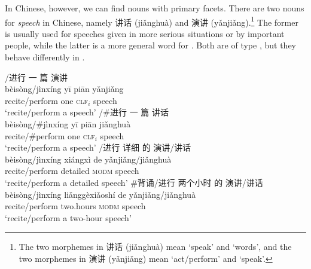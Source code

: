 \documentclass[output=paper,colorlinks,citecolor=brown,chinesefont]{langscibook}
\begin{document}

In Chinese, however, we can find \dott{} nouns with primary facets.
There are two nouns for \emph{speech} in Chinese, namely {\cn 讲话} (ji\v{a}nghu\`{a}) and {\cn 演讲} (y\v{a}nji\v{a}ng).\footnote{The two morphemes in {\cn 讲话} (ji\v{a}nghu\`{a}) mean `speak' and `words', and the two morphemes in {\cn 演讲} (y\v{a}nji\v{a}ng) mean `act/perform' and `speak'. 
}
The former is usually used for speeches given in more serious situations or by important people, while the latter is a more general word for . Both are of type \dott{}, but they behave differently in .



\ea \label{ex:classifierspeech:Chen}
\ea \label{ex:pianyanjiang:Chen}
/{\cn 进行} {\cn 一} {\cn 篇} {\cn 演讲}\\
b\`{e}is\`{o}ng/j\`{i}nx\'{i}ng y\={i} pi\={a}n y\v{a}nji\v{a}ng\\
recite/perform one \textsc{clf}$_i$ speech\\
\glt `recite/perform a speech'
\ex \label{ex:pianjianghua:Chen}
/\#{\cn 进行} {\cn 一} {\cn 篇} {\cn 讲话}\\
b\`{e}is\`{o}ng/\#j\`{i}nx\'{i}ng y\={i} pi\={a}n ji\v{a}nghu\`{a}\\
recite/\#perform one \textsc{clf}$_i$ speech\\
\glt `recite/perform a speech'
%
\ex
{}/{\cn 进行} {\cn 详细} {\cn 的} {\cn 演讲}/{\cn 讲话} \label{ex:detailedspeech:Chen}\\
b\`{e}is\`{o}ng/j\`{i}nx\'{i}ng xi\'{a}ngx\`{i} de y\v{a}nji\v{a}ng/ji\v{a}nghu\`{a}\\
recite/perform detailed \textsc{modm} speech\\
\glt `recite/perform a detailed speech'
\ex 
\glll \#{\cn 背诵}/{\cn 进行} {\cn 两个小时} {\cn 的} {\cn 演讲}/{\cn 讲话} \label{ex:hourspeech:Chen}\\
b\`{e}is\`{o}ng/j\`{i}nx\'{i}ng li\v{a}ngg\`{e}xi\v{a}osh\'{i} de y\v{a}nji\v{a}ng/ji\v{a}nghu\`{a}\\
recite/perform two.hours \textsc{modm} speech\\
\glt `recite/perform a two-hour speech'
\z\z
\end{document}
